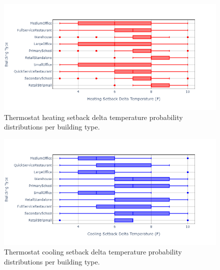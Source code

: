 \begin{figure}
    \centering \includegraphics[width=1.0\textwidth]{figures/heating_setbacks.png}
    \caption{Thermostat heating setback delta temperature probability distributions per building type.}
    \label{fig:therm_heating_setback}
\end{figure}

\begin{figure}
    \centering \includegraphics[width=1.0\textwidth]{figures/cooling_setbacks.png}
    \caption{Thermostat cooling setback delta temperature probability distributions per building type.}
    \label{fig:therm_cooling_setback}
\end{figure}

